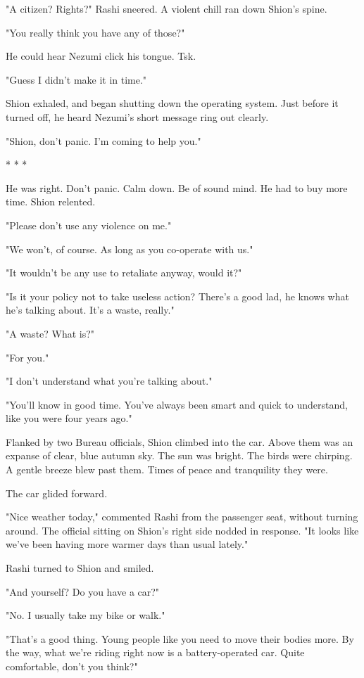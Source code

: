 "A citizen? Rights?" Rashi sneered. A violent chill ran down Shion's
spine.

"You really think you have any of those?"

He could hear Nezumi click his tongue. Tsk.

"Guess I didn't make it in time."

Shion exhaled, and began shutting down the operating system. Just before
it turned off, he heard Nezumi's short message ring out clearly.

"Shion, don't panic. I'm coming to help you."

* * *

He was right. Don't panic. Calm down. Be of sound mind. He had to buy
more time. Shion relented.

"Please don't use any violence on me."

"We won't, of course. As long as you co-operate with us."

"It wouldn't be any use to retaliate anyway, would it?"

"Is it your policy not to take useless action? There's a good lad, he
knows what he's talking about. It's a waste, really."

"A waste? What is?"

"For you."

"I don't understand what you're talking about."

"You'll know in good time. You've always been smart and quick to
understand, like you were four years ago."

Flanked by two Bureau officials, Shion climbed into the car. Above them
was an expanse of clear, blue autumn sky. The sun was bright. The birds
were chirping. A gentle breeze blew past them. Times of peace and
tranquility they were.

The car glided forward.~

"Nice weather today," commented Rashi from the passenger seat, without
turning around. The official sitting on Shion's right side nodded in
response. "It looks like we've been having more warmer days than usual
lately."

Rashi turned to Shion and smiled.

"And yourself? Do you have a car?"

"No. I usually take my bike or walk."

"That's a good thing. Young people like you need to move their bodies
more. By the way, what we're riding right now is a battery-operated car.
Quite comfortable, don't you think?"

